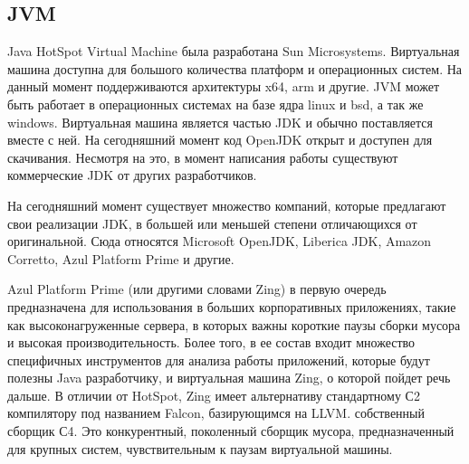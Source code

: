 \subsection{JVM}
Java HotSpot Virtual Machine была разработана Sun Microsystems. Виртуальная машина доступна для большого количества платформ и операционных систем. На данный момент поддерживаются архитектуры x64, arm и другие. JVM может быть работает в операционных системах на базе ядра linux и bsd, а так же windows. Виртуальная машина является частью JDK и обычно поставляется вместе с ней. На сегодняшний момент код OpenJDK открыт и доступен для скачивания. Несмотря на это, в момент написания работы существуют коммерческие JDK от других разработчиков.
\par
На сегодняшний момент существует множество компаний, которые предлагают свои реализации JDK, в большей или меньшей степени отличающихся от оригинальной. Сюда относятся Microsoft OpenJDK, Liberica JDK, Amazon Corretto, Azul Platform Prime и другие.
\par
Azul Platform Prime (или другими словами Zing) в первую очередь предназначена для использования в больших корпоративных приложениях, такие как высоконагруженные сервера, в которых важны короткие паузы сборки мусора и высокая производительность. 
Более того, в ее состав входит множество специфичных инструментов для анализа работы приложений, которые будут полезны Java разработчику, и виртуальная машина Zing, о которой пойдет речь дальше. В отличии от HotSpot, Zing имеет альтернативу стандартному С2 компилятору под названием Falcon, базирующимся на LLVM. собственный сборщик С4. Это конкурентный, поколенный сборщик мусора\cite{C4-perf}, предназначенный для крупных систем, чувствительным к паузам виртуальной машины.

